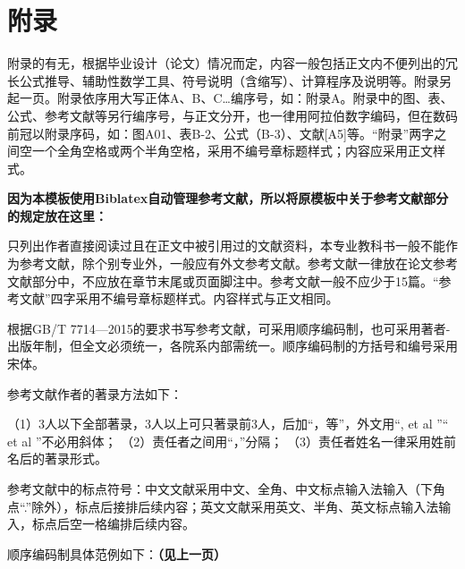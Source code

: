 \chapter{\texorpdfstring{附\quad 录}{附录}} %

附录的有无，根据毕业设计（论文）情况而定，内容一般包括正文内不便列出的冗长公式推导、辅助性数学工具、符号说明（含缩写）、计算程序及说明等。附录另起一页。附录依序用大写正体A、B、C…编序号，如：附录A。附录中的图、表、公式、参考文献等另行编序号，与正文分开，也一律用阿拉伯数字编码，但在数码前冠以附录序码，如：图A01、表B-2、公式（B-3）、文献[A5]等。“附录”两字之间空一个全角空格或两个半角空格，采用不编号章标题样式；内容应采用正文样式。

\vspace{3cm}

{\songti\textbf{因为本模板使用Biblatex自动管理参考文献，所以将原模板中关于参考文献部分的规定放在这里：}}

只列出作者直接阅读过且在正文中被引用过的文献资料，本专业教科书一般不能作为参考文献，除个别专业外，一般应有外文参考文献。参考文献一律放在论文参考文献部分中，不应放在章节末尾或页面脚注中。参考文献一般不应少于15篇。“参考文献”四字采用不编号章标题样式。内容样式与正文相同。

根据GB/T 7714—2015的要求书写参考文献，可采用顺序编码制，也可采用著者-出版年制，但全文必须统一，各院系内部需统一。顺序编码制的方括号和编号采用宋体。

参考文献作者的著录方法如下：

（1）3人以下全部著录，3人以上可只著录前3人，后加“，等”，外文用“, et al ”“ et al ”不必用斜体；
（2）责任者之间用“，”分隔；
（3）责任者姓名一律采用姓前名后的著录形式。

参考文献中的标点符号：中文文献采用中文、全角、中文标点输入法输入（下角点“.”除外），标点后接排后续内容；英文文献采用英文、半角、英文标点输入法输入，标点后空一格编排后续内容。

顺序编码制具体范例如下：{\songti\textbf{（见上一页）}}


\clearpage
